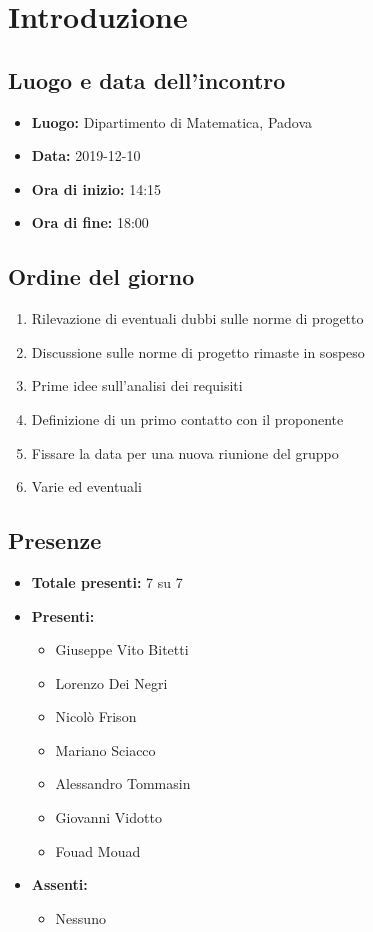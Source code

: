 \section*{Introduzione}

\subsection*{Luogo e data dell'incontro}
	\begin{itemize}
		\item \textbf{Luogo:} Dipartimento di Matematica, Padova
		\item \textbf{Data:} 2019-12-10
		\item \textbf{Ora di inizio:} 14:15
		\item \textbf{Ora di fine:} 18:00
	\end{itemize}

\subsection*{Ordine del giorno}
	\begin{enumerate}
		\item Rilevazione di eventuali dubbi sulle norme di progetto
		\item Discussione sulle norme di progetto rimaste in sospeso
		\item Prime idee sull'analisi dei requisiti
		\item Definizione di un primo contatto con il proponente
		\item Fissare la data per una nuova riunione del gruppo
		\item Varie ed eventuali
	\end{enumerate}

\subsection*{Presenze}
	\begin{itemize}
		\item \textbf{Totale presenti:} 7 su 7
		\item \textbf{Presenti: }
			\begin{itemize}			
				\item Giuseppe Vito Bitetti
				\item Lorenzo Dei Negri
				\item Nicolò Frison
				\item Mariano Sciacco
				\item Alessandro Tommasin
				\item Giovanni Vidotto
				\item Fouad Mouad
			\end{itemize}
		\item \textbf{Assenti: } 
			\begin{itemize}	
				\item Nessuno
			\end{itemize}
	\end{itemize}



